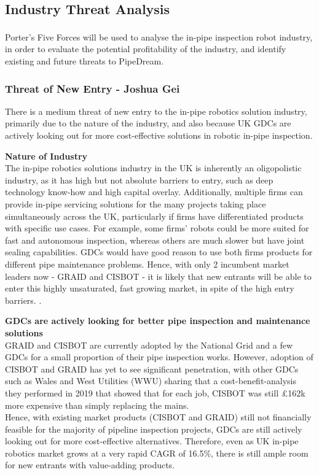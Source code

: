 \documentclass[11pt]{article}		%
\newcommand{\supercite}[1]{\textsuperscript{\cite{#1}}}		%
\begin{document}
		\subsection{Industry Threat Analysis}\label{industryP5F}
			
			Porter's Five Forces\supercite{porter2008five} will be used to analyse the in-pipe inspection robot industry, in order to evaluate the potential profitability of the industry, and identify existing and future threats to PipeDream.

			\subsubsection{Threat of New Entry - Joshua Gei} 
			
			There is a medium threat of new entry to the in-pipe robotics solution industry, primarily due to the nature of the industry, and also because UK GDCs are actively looking out for more cost-effective solutions in robotic in-pipe inspection. 
            
           \textbf{Nature of Industry} 
            \\
            The in-pipe robotics solutions industry in the UK is inherently an oligopolistic industry, as it has high but not absolute barriers to entry, such as deep technology know-how and high capital overlay. Additionally, multiple firms can provide in-pipe servicing solutions for the many projects taking place simultaneously across the UK, particularly if firms have differentiated products with specific use cases. For example, some firms’ robots could be more suited for fast and autonomous inspection, whereas others are much slower but have joint sealing capabilities. GDCs would have good reason to use both firms products for different pipe maintenance problems. Hence, with only 2 incumbent market leaders now - GRAID and CISBOT - it is likely that new entrants will be able to enter this highly unsaturated, fast growing market, in spite of the high entry barriers. .
         
            \textbf{GDCs are actively looking for better pipe inspection and maintenance solutions}
            \\
            GRAID and CISBOT are currently adopted by the National Grid and a few GDCs for a small proportion of their pipe inspection works. However, adoption of CISBOT and GRAID has yet to see significant penetration, with other GDCs such as Wales and West Utilities (WWU) sharing that a cost-benefit-analysis they performed in 2019 that showed that for each job, CISBOT was still £162k more expensive than simply replacing the mains.
            \\
            \hspace*{2ex}Hence, with existing market products (CISBOT and GRAID) still not financially feasible for the majority of pipeline inspection projects, GDCs are still actively looking out for more cost-effective alternatives. Therefore, even as UK in-pipe robotics market grows at a very rapid CAGR of 16.5\%, there is still ample room for new entrants with value-adding products. 
            
\end{document}
